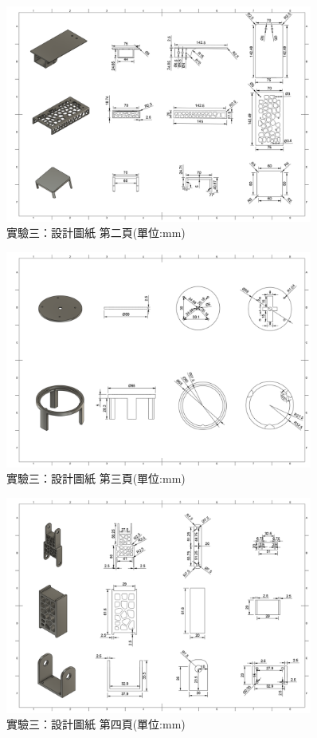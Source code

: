 \documentclass[class=NCU_thesis, crop=false]{standalone}
\begin{document}
\begin{figure}[htbp]
    \centering
    \includegraphics[width=0.9\textwidth]{figures/Armv3 (2).PNG}
    \caption{實驗三：設計圖紙 第二頁(單位:mm)}
\end{figure}

\begin{figure}[htbp]
    \centering
    \includegraphics[width=0.9\textwidth]{figures/Armv3 (3).PNG}
    \caption{實驗三：設計圖紙 第三頁(單位:mm)}
\end{figure}

\begin{figure}[htbp]
    \centering
    \includegraphics[width=0.9\textwidth]{figures/Armv3 (4).PNG}
    \caption{實驗三：設計圖紙 第四頁(單位:mm)}
\end{figure}
\end{document}
